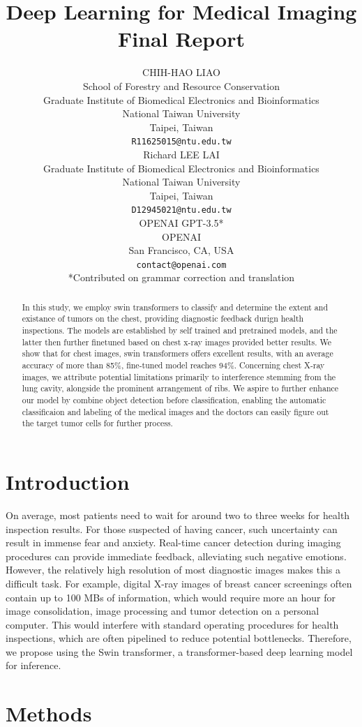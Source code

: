 \documentclass{article}
\title{Deep Learning for Medical Imaging Final Report}
\author{
    CHIH-HAO LIAO \\
    School of Forestry and Resource Conservation\\
    Graduate Institute of Biomedical Electronics and Bioinformatics\\
    National Taiwan University\\
    Taipei, Taiwan\\
    \texttt{R11625015@ntu.edu.tw} \\
    \And
    Richard LEE LAI \\
    Graduate Institute of Biomedical Electronics and Bioinformatics\\
    National Taiwan University\\
    Taipei, Taiwan \\
    \texttt{D12945021@ntu.edu.tw} \\
    \AND
    OPENAI GPT-3.5* \\
    OPENAI \\
    San Francisco, CA, USA \\
    \texttt{contact@openai.com} \\
    \AND
    *Contributed on grammar correction and translation \\
}
\begin{document}
\maketitle
\begin{abstract}
  In this study, we employ swin transformers to classify and determine the extent and existance of tumors on the chest, providing diagnostic feedback durign health inspections. The models are established by self trained and pretrained models, and the latter then further finetuned based on chest x-ray images provided better results. We show that for chest images, swin transformers offers excellent results, with an average accuracy of more than 85\%, fine-tuned model reaches 94\%. Concerning chest X-ray images, we attribute potential limitations primarily to interference stemming from the lung cavity, alongside the prominent arrangement of ribs. We aspire to further enhance our model by combine object detection before classification, enabling the automatic classificaion and labeling of the medical images and the doctors can easily figure out the target tumor cells for further process.
\end{abstract}



\section{Introduction}
\label{sec:headings}
On average, most patients need to wait for around two to three weeks for health inspection results. For those suspected of having cancer, such uncertainty can result in immense fear and anxiety. Real-time cancer detection during imaging procedures can provide immediate feedback, alleviating such negative emotions. However, the relatively high resolution of most diagnostic images makes this a difficult task. For example, digital X-ray images of breast cancer screenings often contain up to 100 MBs of information, which would require more an hour for image consolidation, image processing and tumor detection on a personal computer. This would interfere with standard operating procedures for health inspections, which are often pipelined to reduce potential bottlenecks. Therefore, we propose using the Swin transformer, a transformer-based deep learning model for inference.

\section{Methods}
\end{document}
